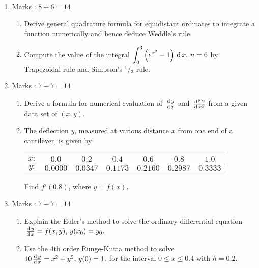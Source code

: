 \documentclass[12pt,class=book,crop=false]{standalone}
\begin{document}
\begin{enumerate}
\begin{enumerate}
\begin{table}[H]
\begin{tabular}{|c|c|c|c|c|}
                        \end{tabular}
                    \end{table}
          \end{enumerate}
    \item Marks : $ 8+6=14 $
          \begin{enumerate}
              \item Derive general quadrature formula for equidistant ordinates to integrate a function numerically and hence deduce Weddle's rule.
              \item Compute the value of the integral $ \displaystyle \int_0^3 \left( e^{x^2}-1 \right)\,\mathrm{d}\, x,\,n=6 $ by Trapezoidal rule and Simpson's $ {}^1/{}_3 $ rule.
          \end{enumerate}
    \item Marks : $ 7+7=14 $
          \begin{enumerate}
              \item Derive a formula for numerical evaluation of $ \,\frac{\mathrm{d}\,y}{\mathrm{d}\,x}  $ and $ \,\frac{\mathrm{d}^{y}\, 2}{\mathrm{d}\, x^{y}} $ from a given data set of $ (x,y) $.
              \item The deflection $ y $, measured at various distance $ x $ from one end of a cantilever, is given by
                    \begin{table}[H]
                        \centering
                        \begin{tabular}{|c|c|c|c|c|c|c|}
                            \hline
                            $ x: $ & $ 0.0 $    & $ 0.2 $    & $ 0.4 $    & $ 0.6 $    & $ 0.8 $    & $ 1.0 $    \\\hline
                            $ y: $ & $ 0.0000 $ & $ 0.0347 $ & $ 0.1173 $ & $ 0.2160 $ & $ 0.2987  $& $ 0.3333 $ \\\hline
                        \end{tabular}
                    \end{table}
                    Find $ f'(0.8) $, where $ y=f(x) $.
          \end{enumerate}
    \item Marks : $ 7+7=14 $
          \begin{enumerate}
              \item Explain the Euler's method to solve the ordinary differential equation $ \,\frac{\mathrm{d}\,y}{\mathrm{d}\,x}=f(x,y),\,y(x_0)=y_0 $.
              \item Use the 4th order Runge-Kutta method to solve $ 10\,\frac{\mathrm{d}\,y}{\mathrm{d}\,x}=x^2+y^2,\,y(0)=1 $, for the interval $ 0\leq x\leq 0.4 $ with $ h=0.2 $.

\end{enumerate}
\end{enumerate}
\end{document}
